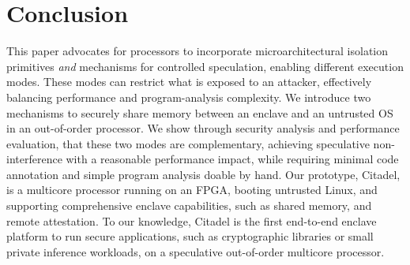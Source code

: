\section{Conclusion}

This paper advocates for processors to incorporate microarchitectural isolation primitives \emph{and} mechanisms for controlled speculation, enabling different execution modes.
These modes can restrict what is exposed to an attacker, 
effectively balancing performance and program-analysis complexity.
We introduce two mechanisms to securely share memory between an enclave and an untrusted OS in an out-of-order processor.
We show through security analysis and performance evaluation, that these two modes are complementary, achieving speculative non-interference with a reasonable performance impact, while requiring minimal code annotation and simple program analysis doable by hand.
Our prototype, Citadel, is a multicore processor running on an FPGA, booting untrusted Linux, and supporting comprehensive enclave capabilities, such as shared memory, and remote attestation.
To our knowledge, Citadel is the first end-to-end enclave platform to run secure applications, such as cryptographic libraries or small private inference workloads, on a speculative out-of-order multicore processor.